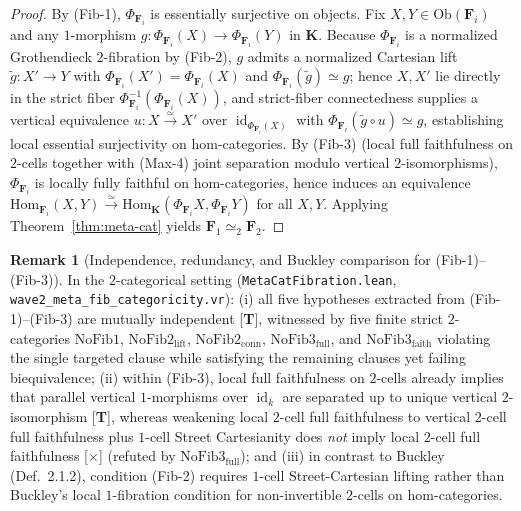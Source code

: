 \documentclass[11pt]{article}
\theoremstyle{plain}
\theoremstyle{definition}
\newtheorem{remark}[theorem]{Remark}
\newcommand{\Ob}{\mathrm{Ob}}
\newcommand{\Hom}{\mathrm{Hom}}
\DeclareMathOperator{\id}{id}
\begin{document}
\begin{proof}
By \textup{(Fib-1)}, $\Phi_{\mathbf{F}_i}$ is essentially surjective on objects. Fix $X, Y \in \Ob(\mathbf{F}_i)$ and any $1$-morphism $g : \Phi_{\mathbf{F}_i}(X) \to \Phi_{\mathbf{F}_i}(Y)$ in $\mathbf{K}$. Because $\Phi_{\mathbf{F}_i}$ is a normalized Grothendieck $2$-fibration by \textup{(Fib-2)}, $g$ admits a normalized Cartesian lift $\tilde{g} : X' \to Y$ with $\Phi_{\mathbf{F}_i}(X') = \Phi_{\mathbf{F}_i}(X)$ and $\Phi_{\mathbf{F}_i}(\tilde{g}) \simeq g$; hence $X, X'$ lie directly in the strict fiber $\Phi_{\mathbf{F}_i}^{-1}(\Phi_{\mathbf{F}_i}(X))$, and strict-fiber connectedness supplies a vertical equivalence $u : X \xrightarrow{\simeq} X'$ over $\id_{\Phi_{\mathbf{F}_i}(X)}$ with $\Phi_{\mathbf{F}_i}(\tilde{g} \circ u) \simeq g$, establishing local essential surjectivity on hom-categories. By \textup{(Fib-3)} (local full faithfulness on $2$-cells together with \textup{(Max-4)} joint separation modulo vertical $2$-isomorphisms), $\Phi_{\mathbf{F}_i}$ is locally fully faithful on hom-categories, hence induces an equivalence $\Hom_{\mathbf{F}_i}(X, Y) \xrightarrow{\simeq} \Hom_{\mathbf{K}}(\Phi_{\mathbf{F}_i} X, \Phi_{\mathbf{F}_i} Y)$ for all $X, Y$. Applying Theorem~\ref{thm:meta-cat} yields $\mathbf{F}_1 \simeq_2 \mathbf{F}_2$.
\end{proof}

\begin{remark}[Independence, redundancy, and Buckley comparison for \textup{(Fib-1)--(Fib-3)}]\label{rem:fib-independence}
In the $2$-categorical setting (\texttt{MetaCatFibration.lean}, \texttt{wave2\_meta\_fib\_categoricity.vr}): (i) all five hypotheses extracted from \textup{(Fib-1)--(Fib-3)} are mutually independent \textup{[\textbf{T}]}, witnessed by five finite strict $2$-categories $\mathrm{NoFib1}$, $\mathrm{NoFib2}_{\mathrm{lift}}$, $\mathrm{NoFib2}_{\mathrm{conn}}$, $\mathrm{NoFib3}_{\mathrm{full}}$, and $\mathrm{NoFib3}_{\mathrm{faith}}$ violating the single targeted clause while satisfying the remaining clauses yet failing biequivalence; (ii) within \textup{(Fib-3)}, local full faithfulness on $2$-cells already implies that parallel vertical $1$-morphisms over $\id_k$ are separated up to unique vertical $2$-isomorphism \textup{[\textbf{T}]}, whereas weakening local $2$-cell full faithfulness to vertical $2$-cell full faithfulness plus $1$-cell Street Cartesianity does \emph{not} imply local $2$-cell full faithfulness \textup{[\textbf{$\times$}]} (refuted by $\mathrm{NoFib3}_{\mathrm{full}}$); and (iii) in contrast to Buckley~\cite{Buckley2014} (Def.~2.1.2), condition \textup{(Fib-2)} requires $1$-cell Street-Cartesian lifting rather than Buckley's local $1$-fibration condition for non-invertible $2$-cells on hom-categories.
\end{remark}
\end{document}
